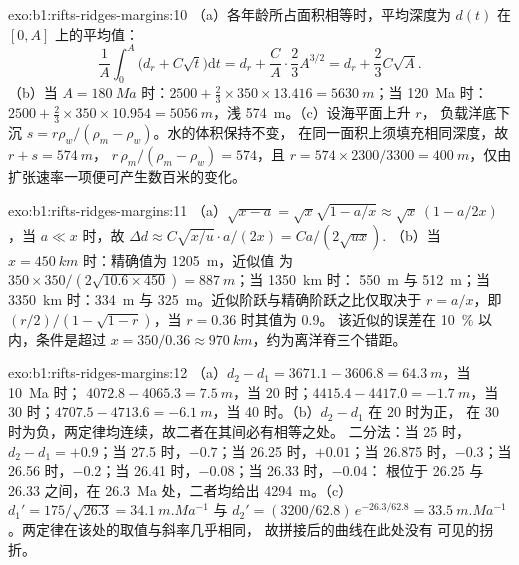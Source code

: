 \begin{solution}{exo:b1:rifts-ridges-margins:10}
（a）各年龄所占面积相等时，平均深度为 $d(t)$ 在
$[0, A]$ 上的平均值：
\[
  \frac1A\int_0^A\bigl(d_r + C\sqrt t\bigr)\mathrm dt = d_r + \frac CA\cdot\frac23A^{3/2}
  = d_r + \frac23C\sqrt A.
\]
（b）当 $A = \qty{180}{Ma}$ 时：$2500 + \frac23\times350\times13.416 =
\qty{5630}{m}$；当 \qty{120}{Ma} 时：$2500 + \frac23\times350\times10.954 =
\qty{5056}{m}$，浅 \qty{574}{m}。（c）设海平面上升 $r$，
负载洋底下沉 $s = r\rho_w/(\rho_m - \rho_w)$。水的体积保持不变，
在同一面积上须填充相同深度，故 $r + s = \qty{574}{m}$，
$r\,\rho_m/(\rho_m - \rho_w) = 574$，且 $r = 574\times2300/3300 =
\qty{400}{m}$，仅由扩张速率一项便可产生数百米的变化。
\end{solution}

\begin{solution}{exo:b1:rifts-ridges-margins:11}
（a）$\sqrt{x - a} = \sqrt x\sqrt{1 - a/x} \approx \sqrt x\,(1 - a/2x)$，当
$a \ll x$ 时，故
$\Delta d \approx C\sqrt{x/u}\cdot a/(2x) = Ca/(2\sqrt{ux})$.
（b）当 $x = \qty{450}{km}$ 时：精确值为 \qty{1205}{m}，近似值
为 $350\times350/(2\sqrt{10.6\times450}) = \qty{887}{m}$；当 \qty{1350}{km} 时：
\qty{550}{m} 与 \qty{512}{m}；当 \qty{3350}{km} 时：\qty{334}{m} 与
\qty{325}{m}。近似阶跃与精确阶跃之比仅取决于
$r = a/x$，即 $(r/2)/(1 - \sqrt{1 - r})$，当 $r = 0.36$ 时其值为 0.9。
该近似的误差在 \qty{10}{\percent} 以内，条件是超过 $x = 350/0.36 \approx
\qty{970}{km}$，约为离洋脊三个错距。
\end{solution}

\begin{solution}{exo:b1:rifts-ridges-margins:12}
（a）$d_2 - d_1 = 3671.1 - 3606.8 = \qty{64.3}{m}$，当 \qty{10}{Ma} 时；
$4072.8 - 4065.3 = \qty{7.5}{m}$，当 20 时；$4415.4 - 4417.0 = \qty{-1.7}{m}$，当
30 时；$4707.5 - 4713.6 = \qty{-6.1}{m}$，当 40 时。（b）$d_2 - d_1$ 在 20 时为正，
在 30 时为负，两定律均连续，故二者在其间必有相等之处。
二分法：当 25 时，$d_2 - d_1 = +0.9$；当 27.5 时，$-0.7$；当 26.25 时，$+0.01$；当
26.875 时，$-0.3$；当 26.56 时，$-0.2$；当 26.41 时，$-0.08$；当 26.33 时，$-0.04$：
根位于 26.25 与 26.33 之间，在 \qty{26.3}{Ma} 处，二者均给出
\qty{4294}{m}。（c）$d_1' = 175/\sqrt{26.3} = \qty{34.1}{m.Ma^{-1}}$ 与
$d_2' = (3200/62.8)\,e^{-26.3/62.8} = \qty{33.5}{m.Ma^{-1}}$。两定律在该处的取值与斜率几乎相同，
故拼接后的曲线在此处没有
可见的拐折。
\end{solution}

